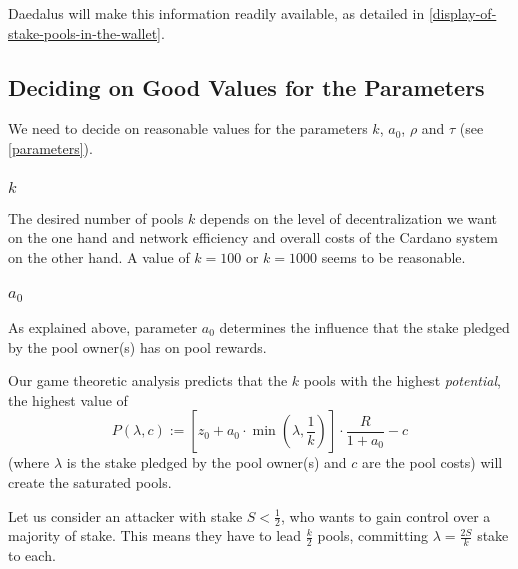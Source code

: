 \documentclass[11pt,a4paper]{article}
\begin{document}
Daedalus will make this information readily available, as detailed in
\cref{display-of-stake-pools-in-the-wallet}. 

\subsection{Deciding on Good Values for the Parameters}
\label{deciding-on-good-values-for-the-parameters}

We need to decide on reasonable values for the parameters \(k\),
\(a_0\), \(\rho\) and \(\tau\) (see \cref{parameters}).

\subsubsection{\texorpdfstring{\(k\)}{k}}

The desired number of pools \(k\) depends on the level of decentralization we
want on the one hand and network efficiency and overall costs of the Cardano
system on the other hand. A value of \(k=100\) or \(k=1000\) seems to be
reasonable.

\subsubsection{\texorpdfstring{\(a_0\)}{a\_0}}

As explained above, parameter \(a_0\) determines the influence that the stake
pledged by the pool owner(s) has on pool rewards.

Our game theoretic analysis predicts that the \(k\) pools with the
highest \emph{potential}, the highest value of \[
    P(\lambda,c):=\left[z_0+a_0\cdot\min\left(\lambda,\frac{1}{k}\right)\right]\cdot\frac{R}{1+a_0}-c
\] (where \(\lambda\) is the stake pledged by the pool owner(s) and \(c\)
are the pool costs) will create the saturated pools.

Let us consider an attacker with stake \(S < \frac{1}{2}\), who wants to
gain control over a majority of stake. This means they have to lead
\(\frac{k}{2}\) pools, committing \(\lambda=\frac{2S}{k}\) stake to
each.
\end{document}

